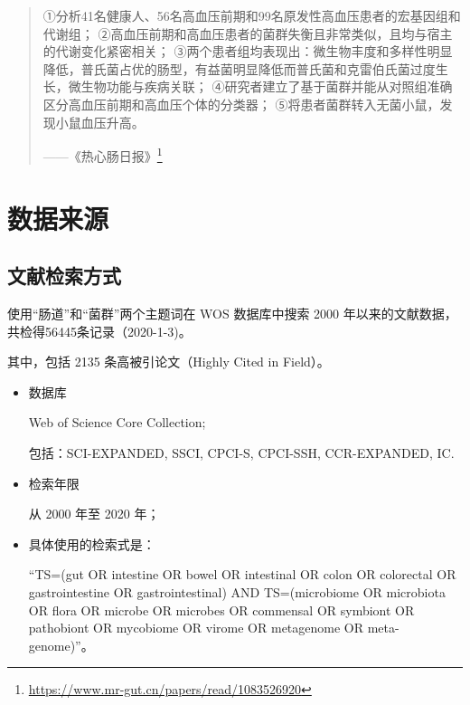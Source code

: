 \documentclass[]{ctexbook}
\renewcommand{\href}[2]{#2\footnote{\url{#1}}}
\begin{document}
\begin{quote}
①分析41名健康人、56名高血压前期和99名原发性高血压患者的宏基因组和代谢组；
②高血压前期和高血压患者的菌群失衡且非常类似，且均与宿主的代谢变化紧密相关；
③两个患者组均表现出：微生物丰度和多样性明显降低，普氏菌占优的肠型，有益菌明显降低而普氏菌和克雷伯氏菌过度生长，微生物功能与疾病关联；
④研究者建立了基于菌群并能从对照组准确区分高血压前期和高血压个体的分类器；
⑤将患者菌群转入无菌小鼠，发现小鼠血压升高。
\begin{flushright}------\href{https://www.mr-gut.cn/papers/read/1083526920}{《热心肠日报》}\end{flushright}
\end{quote}

\cleardoublepage

\hypertarget{appendix-ux9644ux5f55}{%
\appendix {}}


\hypertarget{data-source}{%
\chapter{数据来源}\label{data-source}}

\hypertarget{ux6587ux732eux68c0ux7d22ux65b9ux5f0f}{%
\section{文献检索方式}\label{ux6587ux732eux68c0ux7d22ux65b9ux5f0f}}

使用``肠道''和``菌群''两个主题词在 WOS 数据库中搜索 2000 年以来的文献数据，共检得56445条记录（2020-1-3)。

其中，包括 2135 条高被引论文（Highly Cited in Field）。

\begin{itemize}
\item
  数据库

  Web of Science Core Collection;

  包括：SCI-EXPANDED, SSCI, CPCI-S, CPCI-SSH, CCR-EXPANDED, IC.
\item
  检索年限

  从 2000 年至 2020 年；
\item
  具体使用的检索式是：

  ``TS=(gut OR intestine OR bowel OR intestinal OR colon OR colorectal OR gastrointestine OR gastrointestinal) AND TS=(microbiome OR microbiota OR flora OR microbe OR microbes OR commensal OR symbiont OR pathobiont OR mycobiome OR virome OR metagenome OR meta-genome)''。
\end{itemize}
\end{document}
